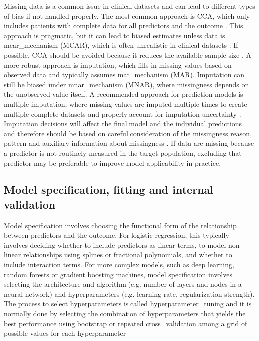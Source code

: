 Missing data is a common issue in clinical datasets and can lead to different types of bias if not handled properly. The most common approach is \gls{CCA}, which only includes patients with complete data for all predictors and the outcome \cite{eekhoutMissingDataSystematic2012}. This approach is pragmatic, but it can lead to biased estimates unless data is \gls{mcar_mechanism} (\gls{MCAR}), which is often unrealistic in clinical datasets \cite{vanderheijdenImputationMissingValues2006}. If possible, \gls{CCA} should be avoided because it reduces the available sample size \cite{Hughes2019}. A more robust approach is imputation, which fills in missing values based on observed data and typically assumes \gls{mar_mechanism} (\gls{MAR}). Imputation can still be biased under \gls{mnar_mechanism} (\gls{MNAR}), where missingness depends on the unobserved value itself. A recommended approach for prediction models is multiple imputation, where missing values are imputed multiple times to create multiple complete datasets and properly account for imputation uncertainty \cite{siskImputationMissingIndicators2023}. Imputation decisions will affect the final model and the individual predictions and therefore should be based on careful consideration of the missingness reason, pattern and auxiliary information about missingness \cite{hughesAccountingMissingData2019}. If data are missing because a predictor is not routinely measured in the target population, excluding that predictor may be preferable to improve model applicability in practice.



\subsection{Model specification, fitting and internal validation}

Model specification involves choosing the functional form of the relationship between predictors and the outcome. For logistic regression, this typically involves deciding whether to include predictors as linear terms, to model non-linear relationships using splines or fractional polynomials, and whether to include interaction terms. For more complex models, such as deep learning, random forests or gradient boosting machines, model specification involves selecting the architecture and algorithm (e.g. number of layers and nodes in a neural network) and hyperparameters (e.g. learning rate, regularization strength). The process to select hyperparameters is called \gls{hyperparameter_tuning} and it is normally done by selecting the combination of hyperparameters that yields the best performance using \gls{bootstrap} or repeated \gls{cross_validation} among a grid of possible values for each hyperparameter  \cite{duniasComparisonHyperparameterTuning2024}. 

